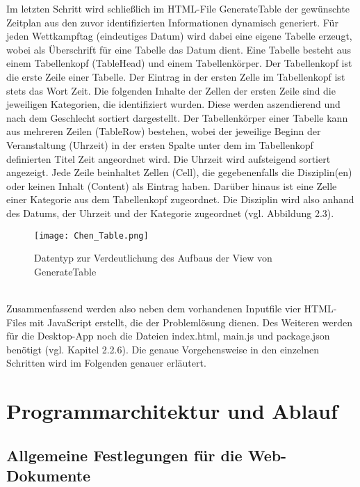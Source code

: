 Im letzten Schritt wird schließlich im HTML-File GenerateTable der gewünschte Zeitplan aus den zuvor identifizierten Informationen dynamisch generiert. Für jeden Wettkampftag (eindeutiges Datum) wird dabei eine eigene Tabelle erzeugt, wobei als Überschrift für eine Tabelle das Datum dient. 
Eine Tabelle besteht aus einem Tabellenkopf (TableHead) und einem Tabellenkörper. Der Tabellenkopf ist die erste Zeile einer Tabelle. Der Eintrag in der ersten Zelle im Tabellenkopf ist stets das Wort Zeit. Die folgenden Inhalte der Zellen der ersten Zeile sind die jeweiligen Kategorien, die identifiziert wurden. Diese werden aszendierend und nach dem Geschlecht sortiert dargestellt. 
Der Tabellenkörper einer Tabelle kann aus mehreren Zeilen (TableRow) bestehen, wobei der jeweilige Beginn der Veranstaltung (Uhrzeit) in der ersten Spalte unter dem im Tabellenkopf definierten Titel Zeit angeordnet wird. Die Uhrzeit wird aufsteigend sortiert angezeigt. Jede Zeile beinhaltet Zellen (Cell), die gegebenenfalls die Disziplin(en) oder keinen Inhalt (Content) als Eintrag haben. Darüber hinaus ist eine Zelle einer Kategorie aus dem Tabellenkopf zugeordnet. Die Disziplin wird also anhand des Datums, der Uhrzeit und der Kategorie zugeordnet (vgl. Abbildung 2.3).
\begin{figure}[htbp]
  \centering
  \texttt{[image: Chen\_Table.png]}
  \caption{Datentyp zur Verdeutlichung des Aufbaus der View von GenerateTable}
  \label{fig:Fig1}
\end{figure} \\
Zusammenfassend werden also neben dem vorhandenen Inputfile vier HTML-Files mit JavaScript erstellt, die der Problemlösung dienen. Des Weiteren werden für die Desktop-App noch die Dateien index.html, main.js und package.json benötigt (vgl. Kapitel 2.2.6). Die genaue Vorgehensweise in den einzelnen Schritten wird im Folgenden genauer erläutert.

\section{Programmarchitektur und Ablauf}

\subsection{Allgemeine Festlegungen für die Web-Dokumente}

